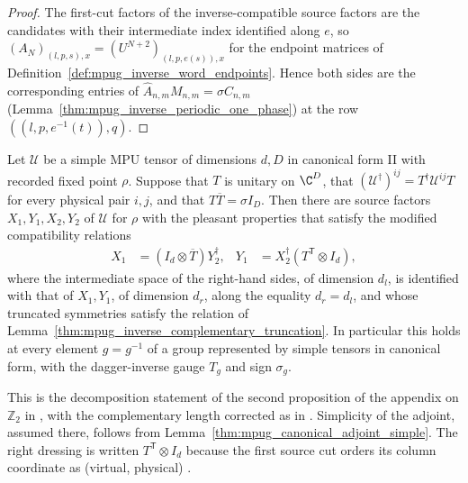 \begin{proof}\leanok
    The first-cut factors of the inverse-compatible source factors are the
    candidates with their intermediate index identified along $e$, so
    $(A_N)_{(l,p,s),x}=(U^{N+2})_{(l,p,e(s)),x}$ for the endpoint matrices of
    Definition~\ref{def:mpug_inverse_word_endpoints}. Hence both sides are
    the corresponding entries of $\widehat A_{n,m}M_{n,m}=\sigma C_{n,m}$
    (Lemma~\ref{thm:mpug_inverse_periodic_one_phase}) at the row
    $((l,p,e^{-1}(t)),q)$.
\end{proof}

\begin{lemma}
    \label{thm:mpug_inverse_pleasant_properties}
    \leanok
    Let $\mathcal U$ be a simple MPU tensor of dimensions $d,D$ in canonical
    form II with recorded fixed point $\rho$. Suppose that $T$ is unitary on
    $\C^D$, that $(\mathcal U^\dagger)^{ij}=T^\dagger\mathcal U^{ij}T$ for every
    physical pair $i,j$, and that $T\overline T=\sigma I_D$. Then there are
    source factors $X_1,Y_1,X_2,Y_2$ of $\mathcal U$ for $\rho$ with the
    pleasant properties that satisfy the modified compatibility relations
    \begin{align}
        X_1 & =(I_d\otimes\overline T)Y_2^\dagger,    &
        Y_1 & =X_2^\dagger(T^{\mathsf T}\otimes I_d),
    \end{align}
    where the intermediate space of the right-hand sides, of dimension $d_l$,
    is identified with that of $X_1,Y_1$, of dimension $d_r$, along the
    equality $d_r=d_l$, and whose truncated symmetries satisfy the relation of
    Lemma~\ref{thm:mpug_inverse_complementary_truncation}. In particular this
    holds at every element $g=g^{-1}$
    of a group represented by simple tensors in canonical form, with the
    dagger-inverse gauge $T_g$ and sign $\sigma_g$.

    This is the decomposition statement of the second proposition of the
    appendix on $\mathbb Z_2$ in \cite[lines~5342--5350]{FrancoRubio2025MPUGauging},
    with the complementary length corrected as in
    \cite{gap:fbc25_complementary_truncation_shared_endpoints}. Simplicity of the
    adjoint, assumed there, follows from
    Lemma~\ref{thm:mpug_canonical_adjoint_simple}. The right dressing is
    written $T^{\mathsf T}\otimes I_d$ because the first source cut orders its
    column coordinate as (virtual, physical)
    \cite{gap:mpu_source_cut_orientation}.
\end{lemma}

